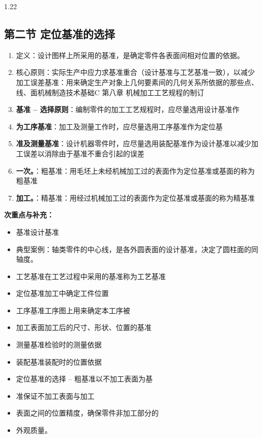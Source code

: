 \documentclass[12pt,a4paper]{article}
\begin{document}
\begin{spacing}{1.22}
\subsection{第二节 定位基准的选择}
\begin{tcolorbox}[colback=yellow!6,colframe=red!55!black,title=重点,left=1mm,right=1mm]
\begin{enumerate}[leftmargin=2.2em,label=\arabic*.]
  \item 定义：设计图样上所采用的基准，是确定零件各表面间相对位置的依据。
  \item 核心原则：实际生产中应力求基准重合（设计基准与工艺基准一致），以减少加工误差基准：用来确定生产对象上几何要素间的几何关系所依据的那些点、线、面机械制造技术基础C 第八章 机械加工工艺规程的制订
  \item \textbf{基准 – 选择原则}：编制零件的加工工艺规程时，应尽量选用设计基准作
  \item \textbf{为工序基准}：加工及测量工作时，应尽量选用工序基准作为定位基
  \item \textbf{准及测量基准}：设计机器零件时，应尽量选用装配基准作为设计基准以减少加工误差以消除由于基准不重合引起的误差
  \item \textbf{一次。}：粗基准：用毛坯上未经机械加工过的表面作为定位基准或基面的称为粗基准
  \item \textbf{加工。}：精基准：用经过机械加工过的表面作为定位基准或基面的称为精基准
\end{enumerate}
\end{tcolorbox}
\noindent\textbf{次重点与补充：}
\begin{itemize}[leftmargin=2.2em,label=--]
  \item 基准设计基准
  \item 典型案例：轴类零件的中心线，是各外圆表面的设计基准，决定了圆柱面的同轴度。
  \item 工艺基准在工艺过程中采用的基准称为工艺基准
  \item 定位基准加工中确定工件位置
  \item 工序基准工序图上用来确定本工序被
  \item 加工表面加工后的尺寸、形状、位置的基准
  \item 测量基准检验时的测量依据
  \item 装配基准装配时的位置依据
  \item 定位基准的选择 – 粗基准以不加工表面为基
  \item 准保证不加工表面与加工
  \item 表面之间的位置精度，确保零件非加工部分的
  \item 外观质量。

\end{itemize}
\end{spacing}
\end{document}

